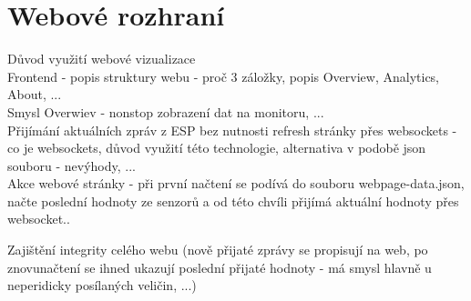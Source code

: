 \chapter{Webové rozhraní} \label{chap:web_page}

Důvod využití webové vizualizace \\ 
Frontend - popis struktury webu - proč 3 záložky, popis Overview, Analytics, About, ... \\
Smysl Overwiev - nonstop zobrazení dat na monitoru, ... \\
Přijímání aktuálních zpráv z ESP bez nutnosti refresh stránky přes websockets - co je websockets, důvod využití této technologie, alternativa v podobě json souboru - nevýhody, ... \\

Akce webové stránky - při první načtení se podívá do souboru webpage-data.json, načte poslední hodnoty ze senzorů a od této chvíli přijímá aktuální hodnoty přes websocket..

Zajištění integrity celého webu (nově přijaté zprávy se propisují na web, po znovunačtení se ihned ukazují poslední přijaté hodnoty - má smysl hlavně u neperidicky posílaných veličin, ...) \\



